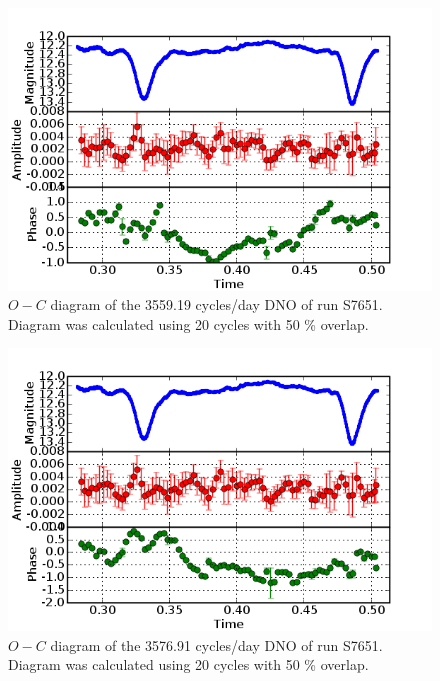 \begin{figure}
 \centering
 \includegraphics[width = 0.8\columnwidth, bb=0 0 600 400]{images/run1_flat.png}
 \caption[$O-C$ diagram of the 3559.19 cycles/day DNO of run S7651.]{$O-C$ diagram of the 3559.19 cycles/day DNO of run S7651. Diagram was calculated using 20 cycles with 50 \% overlap.}
 \label{OC_S7651_1}
\end{figure}


\begin{figure}
 \centering
 \includegraphics[width = 0.8\columnwidth, bb=0 0 600 400]{images/run1_flat_2.png}
 \caption[$O-C$ diagram of the 3576.91 cycles/day DNO of run S7651.]{$O-C$ diagram of the 3576.91 cycles/day DNO of run S7651. Diagram was calculated using 20 cycles with 50 \% overlap.}
 \label{OC_S7651_2}
\end{figure}


